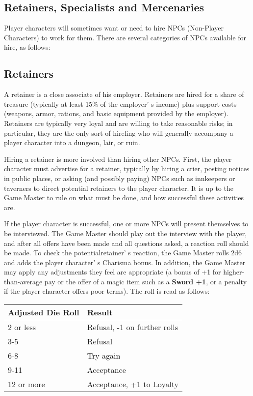 \documentclass[a4paper,twoside,openany,10pt]{book}
\begin{document}
\subsection{Retainers, Specialists and Mercenaries} \label{retainers-specialists-and-mercenaries}

\begin{multicols}{2}
	
Player characters will sometimes want or need to hire NPCs (Non-Player Characters) to work for them. There are several categories of NPCs available for hire, as follows:

\subsection{Retainers}\label{retainers}

A retainer is a close associate of his employer. Retainers are hired for a share of treasure (typically at least 15\% of the employer' s income) plus support costs (weapons, armor, rations, and basic equipment provided by the employer). Retainers are typically very loyal and are willing to take reasonable risks; in particular, they are the only sort of hireling who will generally accompany a player character into a dungeon, lair, or ruin.

Hiring a retainer is more involved than hiring other NPCs. First, the player character must advertise for a retainer, typically by hiring a crier, posting notices in public places, or asking (and possibly paying) NPCs such as innkeepers or taverners to direct potential retainers to the player character. It is up to the Game Master to rule on what must be done, and how successful these activities are.

If the player character is successful, one or more NPCs will present themselves to be interviewed. The Game Master should play out the interview with the player, and after all offers have been made and all questions asked, a reaction roll should be made. To check the potentialretainer' s reaction, the Game Master rolls 2d6 and adds the player character' s Charisma bonus. In addition, the Game Master may apply any adjustments they feel are appropriate (a bonus of +1 for higher-than-average pay or the offer of a magic item such as a \textbf{Sword +1}, or a penalty if the player character offers poor terms). The roll is read as follows:\\

\begin{tabular*}{0.93\linewidth}{@{\extracolsep{\fill}}ll}
\textbf{Adjusted Die Roll} & \textbf{Result} \\\toprule
2 or less & Refusal, -1 on further rolls \\\hline
3-5 & Refusal \\\hline
6-8 & Try again \\\hline
9-11 & Acceptance \\\hline
12 or more & Acceptance, +1 to Loyalty \\\bottomrule
\end{tabular*}\\\medskip


\end{multicols}
\end{document}
